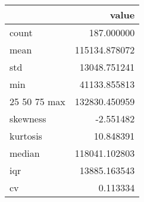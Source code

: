 \begin{tabular}{lr}
\toprule
 & value \\
\midrule
count & 187.000000 \\
mean & 115134.878072 \\
std & 13048.751241 \\
min & 41133.855813 \\
25%
50%
75%
max & 132830.450959 \\
skewness & -2.551482 \\
kurtosis & 10.848391 \\
median & 118041.102803 \\
iqr & 13885.163543 \\
cv & 0.113334 \\
\bottomrule
\end{tabular}

